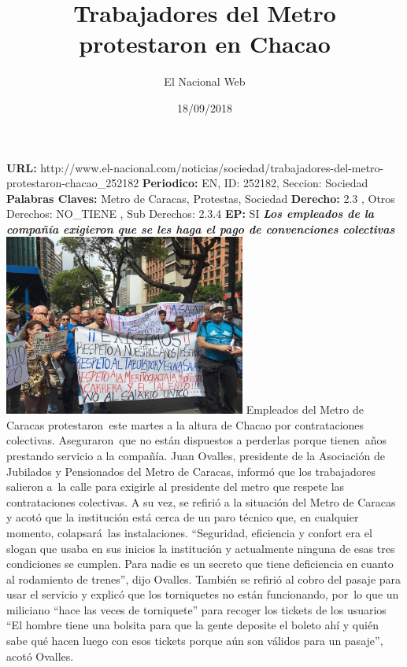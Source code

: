 \documentclass{article}%
\title{\textbf{Trabajadores del Metro protestaron en Chacao}}%
\author{El Nacional Web}%
\date{18/09/2018}%
\begin{document}
%
\normalsize%
\maketitle%
\textbf{URL: }%
http://www.el{-}nacional.com/noticias/sociedad/trabajadores{-}del{-}metro{-}protestaron{-}chacao\_252182\newline%
%
\textbf{Periodico: }%
EN, %
ID: %
252182, %
Seccion: %
Sociedad\newline%
%
\textbf{Palabras Claves: }%
Metro de Caracas, Protestas, Sociedad\newline%
%
\textbf{Derecho: }%
2.3%
, Otros Derechos: %
NO\_TIENE%
, Sub Derechos: %
2.3.4%
\newline%
%
\textbf{EP: }%
SI\newline%
\newline%
%
\textbf{\textit{Los empleados de la compañía exigieron que se les haga el pago de convenciones colectivas}}%
\newline%
\newline%
%
\includegraphics[width=300px]{109.jpg}%
\newline%
%
Empleados del Metro de Caracas protestaron~este martes a la altura de Chacao por contrataciones colectivas. Aseguraron~que no están dispuestos a perderlas porque tienen~años prestando servicio a la compañía.%
\newline%
%
Juan Ovalles, presidente de la Asociación de Jubilados y Pensionados del Metro de Caracas, informó que los trabajadores salieron a~la calle para exigirle al presidente del metro que respete las contrataciones colectivas.%
\newline%
%
A su vez, se refirió a la situación del Metro de Caracas y acotó que la institución está cerca de un paro técnico que, en cualquier momento, colapsará~las instalaciones.%
\newline%
%
“Seguridad, eficiencia y confort era el slogan que usaba en sus inicios la institución y actualmente ninguna de esas tres condiciones se cumplen. Para nadie es un secreto que tiene deficiencia en cuanto al rodamiento de trenes”, dijo Ovalles.%
\newline%
%
También se refirió al cobro del pasaje para usar el servicio y explicó que los torniquetes no están funcionando, por~lo que un miliciano “hace las veces de torniquete” para recoger los tickets de los usuarios%
\newline%
%
“El hombre tiene una bolsita para que la gente deposite el boleto ahí y quién sabe qué hacen luego con esos tickets porque aún son válidos para un pasaje”, acotó Ovalles.%
\newline%
%
\end{document}

